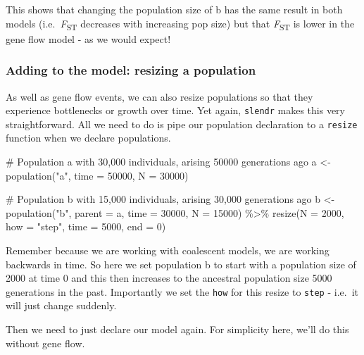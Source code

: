 \documentclass[
  letterpaper,
  DIV=11,
  numbers=noendperiod]{scrartcl}
\newenvironment{Shaded}{\begin{snugshade}}{\end{snugshade}}
\newcommand{\AttributeTok}[1]{\textcolor[rgb]{0.40,0.45,0.13}{#1}}
\newcommand{\CommentTok}[1]{\textcolor[rgb]{0.37,0.37,0.37}{#1}}
\newcommand{\DecValTok}[1]{\textcolor[rgb]{0.68,0.00,0.00}{#1}}
\newcommand{\FunctionTok}[1]{\textcolor[rgb]{0.28,0.35,0.67}{#1}}
\newcommand{\NormalTok}[1]{\textcolor[rgb]{0.00,0.23,0.31}{#1}}
\newcommand{\OtherTok}[1]{\textcolor[rgb]{0.00,0.23,0.31}{#1}}
\newcommand{\SpecialCharTok}[1]{\textcolor[rgb]{0.37,0.37,0.37}{#1}}
\newcommand{\StringTok}[1]{\textcolor[rgb]{0.13,0.47,0.30}{#1}}
\begin{document}
This shows that changing the population size of b has the same result in
both models (i.e.~\emph{F}\textsubscript{ST} decreases with increasing
pop size) but that \emph{F}\textsubscript{ST} is lower in the gene flow
model - as we would expect!

\hypertarget{adding-to-the-model-resizing-a-population}{%
\subsubsection{Adding to the model: resizing a
population}\label{adding-to-the-model-resizing-a-population}}

As well as gene flow events, we can also resize populations so that they
experience bottlenecks or growth over time. Yet again, \texttt{slendr}
makes this very straightforward. All we need to do is pipe our
population declaration to a \texttt{resize} function when we declare
populations.

\begin{Shaded}
\begin{Highlighting}[]
\CommentTok{\# Population a with 30,000 individuals, arising 50000 generations ago}
\NormalTok{a }\OtherTok{\textless{}{-}} \FunctionTok{population}\NormalTok{(}\StringTok{"a"}\NormalTok{, }\AttributeTok{time =} \DecValTok{50000}\NormalTok{, }\AttributeTok{N =} \DecValTok{30000}\NormalTok{)}

\CommentTok{\# Population b with 15,000 individuals, arising 30,000 generations ago}
\NormalTok{b }\OtherTok{\textless{}{-}} \FunctionTok{population}\NormalTok{(}\StringTok{"b"}\NormalTok{, }\AttributeTok{parent =}\NormalTok{ a, }\AttributeTok{time =} \DecValTok{30000}\NormalTok{, }\AttributeTok{N =} \DecValTok{15000}\NormalTok{) }\SpecialCharTok{\%\textgreater{}\%}
  \FunctionTok{resize}\NormalTok{(}\AttributeTok{N =} \DecValTok{2000}\NormalTok{, }\AttributeTok{how =} \StringTok{"step"}\NormalTok{, }\AttributeTok{time =} \DecValTok{5000}\NormalTok{, }\AttributeTok{end =} \DecValTok{0}\NormalTok{)}
\end{Highlighting}
\end{Shaded}

Remember because we are working with coalescent models, we are working
backwards in time. So here we set population b to start with a
population size of 2000 at time 0 and this then increases to the
ancestral population size 5000 generations in the past. Importantly we
set the \texttt{how} for this resize to \texttt{step} - i.e.~it will
just change suddenly.

Then we need to just declare our model again. For simplicity here, we'll
do this without gene flow.
\end{document}
